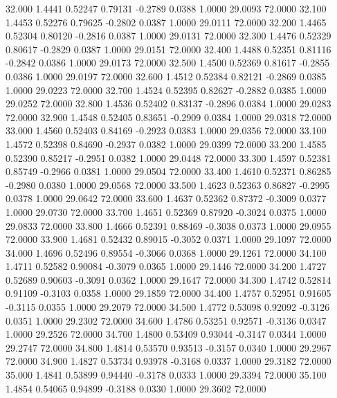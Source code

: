   32.000   1.4441   0.52247   0.79131  -0.2789   0.0388   1.0000  29.0093  72.0000
  32.100   1.4453   0.52276   0.79625  -0.2802   0.0387   1.0000  29.0111  72.0000
  32.200   1.4465   0.52304   0.80120  -0.2816   0.0387   1.0000  29.0131  72.0000
  32.300   1.4476   0.52329   0.80617  -0.2829   0.0387   1.0000  29.0151  72.0000
  32.400   1.4488   0.52351   0.81116  -0.2842   0.0386   1.0000  29.0173  72.0000
  32.500   1.4500   0.52369   0.81617  -0.2855   0.0386   1.0000  29.0197  72.0000
  32.600   1.4512   0.52384   0.82121  -0.2869   0.0385   1.0000  29.0223  72.0000
  32.700   1.4524   0.52395   0.82627  -0.2882   0.0385   1.0000  29.0252  72.0000
  32.800   1.4536   0.52402   0.83137  -0.2896   0.0384   1.0000  29.0283  72.0000
  32.900   1.4548   0.52405   0.83651  -0.2909   0.0384   1.0000  29.0318  72.0000
  33.000   1.4560   0.52403   0.84169  -0.2923   0.0383   1.0000  29.0356  72.0000
  33.100   1.4572   0.52398   0.84690  -0.2937   0.0382   1.0000  29.0399  72.0000
  33.200   1.4585   0.52390   0.85217  -0.2951   0.0382   1.0000  29.0448  72.0000
  33.300   1.4597   0.52381   0.85749  -0.2966   0.0381   1.0000  29.0504  72.0000
  33.400   1.4610   0.52371   0.86285  -0.2980   0.0380   1.0000  29.0568  72.0000
  33.500   1.4623   0.52363   0.86827  -0.2995   0.0378   1.0000  29.0642  72.0000
  33.600   1.4637   0.52362   0.87372  -0.3009   0.0377   1.0000  29.0730  72.0000
  33.700   1.4651   0.52369   0.87920  -0.3024   0.0375   1.0000  29.0833  72.0000
  33.800   1.4666   0.52391   0.88469  -0.3038   0.0373   1.0000  29.0955  72.0000
  33.900   1.4681   0.52432   0.89015  -0.3052   0.0371   1.0000  29.1097  72.0000
  34.000   1.4696   0.52496   0.89554  -0.3066   0.0368   1.0000  29.1261  72.0000
  34.100   1.4711   0.52582   0.90084  -0.3079   0.0365   1.0000  29.1446  72.0000
  34.200   1.4727   0.52689   0.90603  -0.3091   0.0362   1.0000  29.1647  72.0000
  34.300   1.4742   0.52814   0.91109  -0.3103   0.0358   1.0000  29.1859  72.0000
  34.400   1.4757   0.52951   0.91605  -0.3115   0.0355   1.0000  29.2079  72.0000
  34.500   1.4772   0.53098   0.92092  -0.3126   0.0351   1.0000  29.2302  72.0000
  34.600   1.4786   0.53251   0.92571  -0.3136   0.0347   1.0000  29.2526  72.0000
  34.700   1.4800   0.53409   0.93044  -0.3147   0.0344   1.0000  29.2747  72.0000
  34.800   1.4814   0.53570   0.93513  -0.3157   0.0340   1.0000  29.2967  72.0000
  34.900   1.4827   0.53734   0.93978  -0.3168   0.0337   1.0000  29.3182  72.0000
  35.000   1.4841   0.53899   0.94440  -0.3178   0.0333   1.0000  29.3394  72.0000
  35.100   1.4854   0.54065   0.94899  -0.3188   0.0330   1.0000  29.3602  72.0000
